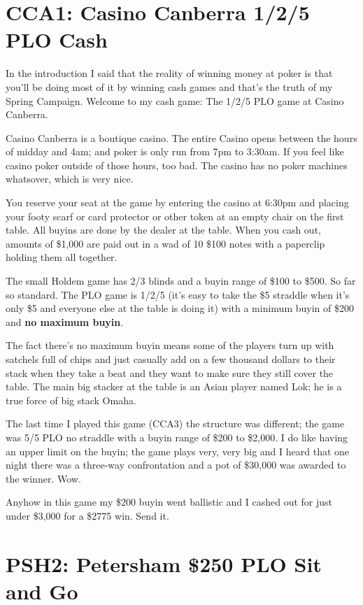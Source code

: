 \section*{CCA1: Casino Canberra 1/2/5 PLO Cash}

In the introduction I said that the reality of winning money at poker
is that you'll be doing most of it by winning cash games and that's
the truth of my Spring Campaign. Welcome to my cash game: The 1/2/5
PLO game at Casino Canberra.

Casino Canberra is a boutique casino. The entire Casino opens between
the hours of midday and 4am; and poker is only run from 7pm to
3:30am. If you feel like casino poker outside of those hours, too bad.
The casino has no poker machines whatsover, which is very nice.

You reserve your seat at the game by entering the casino at 6:30pm and
placing your footy scarf or card protector or other token at an empty
chair on the first table. All buyins are done by the dealer at the
table. When you cash out, amounts of \$1,000 are paid out in a wad of
10 \$100 notes with a paperclip holding them all together.

The small Holdem game has 2/3 blinds and a buyin range of \$100 to
\$500. So far so standard. The PLO game is 1/2/5 (it's easy to take
the \$5 straddle when it's only \$5 and everyone else at the table is
doing it) with a minimum buyin of \$200 and \textbf{no maximum buyin}.

The fact there's no maximum buyin means some of the players turn up
with satchels full of chips and just casually add on a few thousand
dollars to their stack when they take a beat and they want to make
sure they still cover the table. The main big stacker at the table is
an Asian player named Lok; he is a true force of big stack Omaha.

The last time I played this game (CCA3) the structure was different;
the game was 5/5 PLO no straddle with a buyin range of \$200 to
\$2,000. I do like having an upper limit on the buyin; the game plays
very, very big and I heard that one night there was a three-way
confrontation and a pot of \$30,000 was awarded to the winner. Wow.

Anyhow in this game my \$200 buyin went ballistic and I cashed out for
just under \$3,000 for a \$2775 win. Send it.

\section*{PSH2: Petersham \$250 PLO Sit and Go}

